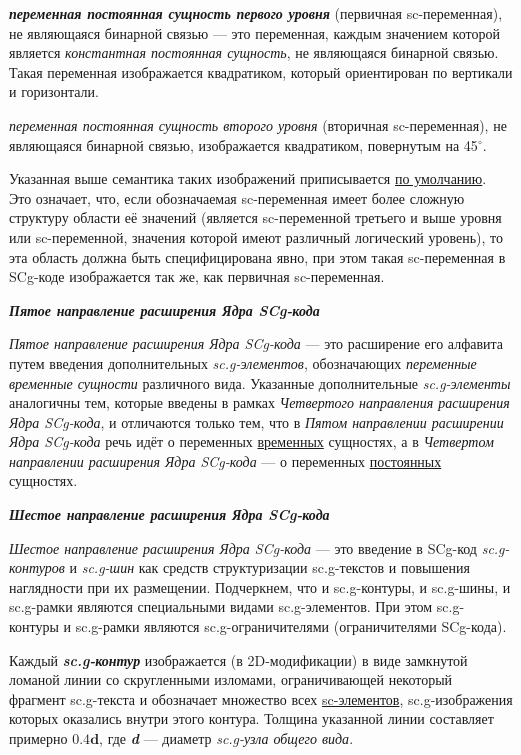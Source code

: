 \textbf{\textit{переменная постоянная сущность первого уровня}} (первичная sc-переменная), не являющаяся бинарной связью --- это переменная, каждым значением которой является \textit{константная постоянная сущность}, не являющаяся бинарной связью. Такая переменная изображается квадратиком, который ориентирован по вертикали и горизонтали. 

\textit{переменная постоянная сущность второго уровня} (вторичная sc-переменная), не являющаяся бинарной связью, изображается квадратиком, повернутым на 45$^\circ$. 

Указанная выше семантика таких изображений приписывается \uline{по умолчанию}. Это означает, что, если обозначаемая sc-переменная имеет более сложную структуру области её значений (является sc-переменной третьего и выше уровня или sc-переменной, значения которой имеют различный логический уровень), то эта область должна быть специфицирована явно, при этом такая sc-переменная в SCg-коде изображается так же, как первичная sc-переменная.

\textbf{\textit{Пятое направление расширения Ядра SCg-кода}}
	
\textit{Пятое направление расширения Ядра SCg-кода} --- это расширение его алфавита путем введения дополнительных \textit{sc.g-элементов}, обозначающих \textit{переменные временные сущности} различного вида. Указанные дополнительные \textit{sc.g-элементы} аналогичны тем, которые введены в рамках \textit{Четвертого направления расширения Ядра SCg-кода}, и отличаются только тем, что в \textit{Пятом направлении расширении Ядра SCg-кода} речь идёт о переменных \uline{временных} сущностях, а в \textit{Четвертом направлении расширения Ядра SCg-кода} --- о переменных \uline{постоянных} сущностях.

\textbf{\textit{Шестое направление расширения Ядра SCg-кода}}

\textit{Шестое направление расширения Ядра SCg-кода} --- это введение в SCg-код \textit{sc.g-контуров} и \textit{sc.g-шин} как средств структуризации sc.g-текстов и повышения наглядности при их размещении. Подчеркнем, что и sc.g-контуры, и sc.g-шины, и sc.g-рамки являются специальными видами sc.g-элементов. При этом sc.g-контуры и sc.g-рамки являются sc.g-ограничителями (ограничителями SCg-кода).

Каждый \textbf{\textit{sc.g-контур}} изображается (в 2D-модификации) в виде замкнутой ломаной линии со скругленными изломами, ограничивающей некоторый фрагмент sc.g-текста и обозначает множество всех \uline{sc-элементов}, sc.g-изображения которых оказались внутри этого контура. Толщина указанной линии составляет примерно $\bm{0.4d}$, где \textbf{\textit{d}} --- диаметр \textit{sc.g-узла общего вида}.

